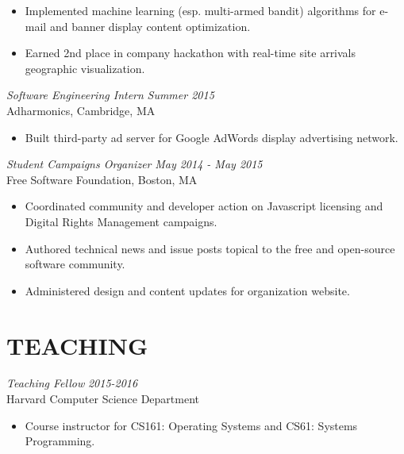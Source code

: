 \documentclass{res}
\begin{document}
\begin{resume}
\begin{itemize}
        \item Implemented machine learning (esp. multi-armed bandit) algorithms
            for e-mail and banner display content optimization. 

        \item Earned 2nd place in company hackathon with real-time site
            arrivals geographic visualization.

    \end{itemize}
                 
    {\sl Software Engineering Intern} \hfill {\sl Summer 2015} \\
    Adharmonics, Cambridge, MA

    \begin{itemize} \itemsep -2.5pt

        \item Built third-party ad server for Google AdWords display
            advertising network. 

    \end{itemize} 

    {\sl Student Campaigns Organizer} \hfill {\sl May 2014 - May 2015} \\
    Free Software Foundation, Boston, MA

    \begin{itemize}   \itemsep -2.5pt 
        \item Coordinated community and developer action on Javascript
            licensing and Digital Rights Management campaigns.

        \item Authored technical news and issue posts topical to the free and
            open-source software community.

        \item Administered design and content updates for organization website.

    \end{itemize} 

\section{TEACHING}
    {\sl Teaching Fellow} \hfill {\sl 2015-2016} \\
    Harvard Computer Science Department

    \begin{itemize} \itemsep -2.5pt
        \item Course instructor for CS161: Operating Systems and CS61: Systems
            Programming.


\end{itemize}
\end{resume}
\end{document}
